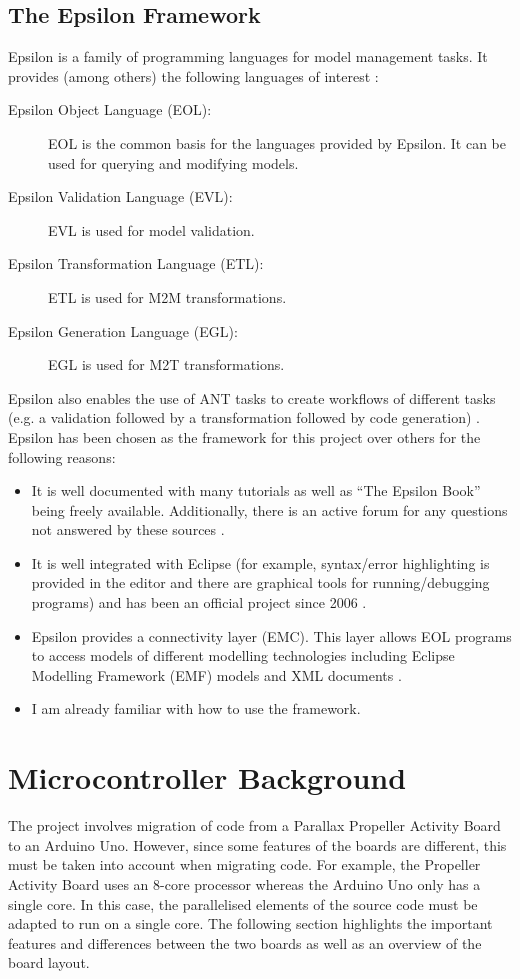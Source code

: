 \documentclass{UoYCSproject}
\begin{document}
\subsection{The Epsilon Framework}
Epsilon is a family of programming languages for model management tasks. It provides (among others) the following languages of interest \parencite{kolovos2010epsilon}:
\begin{description}
\item[Epsilon Object Language (EOL):] EOL is the common basis for the languages provided by Epsilon. It can be used for querying and modifying models.
\item[Epsilon Validation Language (EVL):] EVL is used for model validation.
\item[Epsilon Transformation Language (ETL):] ETL is used for M2M transformations.
\item[Epsilon Generation Language (EGL):] EGL is used for M2T transformations.
\end{description}
Epsilon also enables the use of ANT tasks to create workflows of different tasks (e.g. a validation followed by a
transformation followed by code generation) \parencite{kolovos2010epsilon}.
\newline
Epsilon has been chosen as the framework for this project over others for the following reasons:
\begin{itemize}
\item It is well documented with many tutorials as well as ``The Epsilon Book'' being freely available. Additionally, there is an active forum for any questions not answered by these sources \parencite{epsilonsite}.
\item It is well integrated with Eclipse (for example, syntax/error highlighting is provided in the editor and there are graphical tools for running/debugging programs) and has been an official project since 2006 \parencite{epsilonsite}.
\item Epsilon provides a connectivity layer (EMC). This layer allows EOL programs to access models of different modelling technologies including Eclipse Modelling Framework (EMF) models and XML documents \parencite{epsilonsite}.
\item I am already familiar with how to use the framework.
\end{itemize}

\section{Microcontroller Background} \label{mc_bg}
The project involves migration of code from a Parallax Propeller Activity Board to an Arduino Uno. However, since some features of the boards are different, this must be taken into account when migrating code. For example, the Propeller Activity Board uses an 8-core processor whereas the Arduino Uno only has a single core. In this case, the parallelised elements of the source code must be adapted to run on a single core. The following section highlights the important features and differences between the two boards as well as an overview of the board layout.
\end{document}
